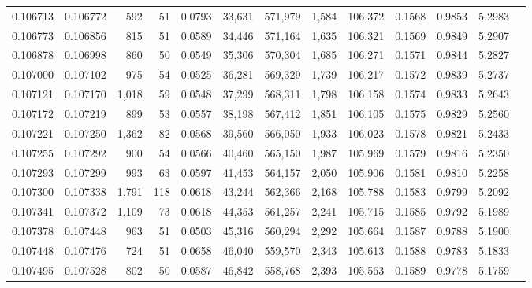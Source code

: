 \begin{tabular}{rrrrrrrrrrrrr}
0.106713 & 0.106772 &   592 &  51 &                                     0.0793 &  33,631 & 571,979 &   1,584 & 106,372 & 0.1568 & 0.9853 & 5.2983 \\
0.106773 & 0.106856 &   815 &  51 &                                     0.0589 &  34,446 & 571,164 &   1,635 & 106,321 & 0.1569 & 0.9849 & 5.2907 \\
0.106878 & 0.106998 &   860 &  50 &                                     0.0549 &  35,306 & 570,304 &   1,685 & 106,271 & 0.1571 & 0.9844 & 5.2827 \\
0.107000 & 0.107102 &   975 &  54 &                                     0.0525 &  36,281 & 569,329 &   1,739 & 106,217 & 0.1572 & 0.9839 & 5.2737 \\
0.107121 & 0.107170 & 1,018 &  59 &                                     0.0548 &  37,299 & 568,311 &   1,798 & 106,158 & 0.1574 & 0.9833 & 5.2643 \\
0.107172 & 0.107219 &   899 &  53 &                                     0.0557 &  38,198 & 567,412 &   1,851 & 106,105 & 0.1575 & 0.9829 & 5.2560 \\
0.107221 & 0.107250 & 1,362 &  82 &                                     0.0568 &  39,560 & 566,050 &   1,933 & 106,023 & 0.1578 & 0.9821 & 5.2433 \\
0.107255 & 0.107292 &   900 &  54 &                                     0.0566 &  40,460 & 565,150 &   1,987 & 105,969 & 0.1579 & 0.9816 & 5.2350 \\
0.107293 & 0.107299 &   993 &  63 &                                     0.0597 &  41,453 & 564,157 &   2,050 & 105,906 & 0.1581 & 0.9810 & 5.2258 \\
0.107300 & 0.107338 & 1,791 & 118 &                                     0.0618 &  43,244 & 562,366 &   2,168 & 105,788 & 0.1583 & 0.9799 & 5.2092 \\
0.107341 & 0.107372 & 1,109 &  73 &                                     0.0618 &  44,353 & 561,257 &   2,241 & 105,715 & 0.1585 & 0.9792 & 5.1989 \\
0.107378 & 0.107448 &   963 &  51 &                                     0.0503 &  45,316 & 560,294 &   2,292 & 105,664 & 0.1587 & 0.9788 & 5.1900 \\
0.107448 & 0.107476 &   724 &  51 &                                     0.0658 &  46,040 & 559,570 &   2,343 & 105,613 & 0.1588 & 0.9783 & 5.1833 \\
0.107495 & 0.107528 &   802 &  50 &                                     0.0587 &  46,842 & 558,768 &   2,393 & 105,563 & 0.1589 & 0.9778 & 5.1759 \\

\end{tabular}
